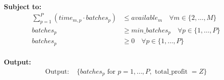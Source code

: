 \documentclass{article}
\begin{document}
\textbf{Subject to:}
\begin{align*}
\sum_{p=1}^{P} (time_{m,p} \cdot batches_{p}) & \leq available_{m} \quad \forall m \in \{2, \ldots, M\} \\
batches_{p} & \geq min\_batches_{p} \quad \forall p \in \{1, \ldots, P\} \\
batches_{p} & \geq 0 \quad \forall p \in \{1, \ldots, P\} \\
\end{align*}

\textbf{Output:}
\begin{align*}
\text{Output: } & \{batches_{p} \text{ for } p = 1, \ldots, P, \text{ total\_profit } = Z\}
\end{align*}
\end{document}
